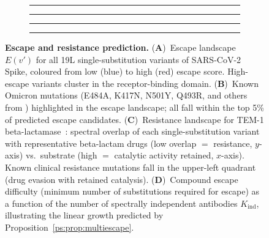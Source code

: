 \begin{figure}[t]
\centering
\begin{subfigure}[b]{0.23\textwidth}
  \rule{\textwidth}{0.6\textwidth}
  \caption{}
  \label{ps:fig:esc_landscape}
\end{subfigure}
\hfill
\begin{subfigure}[b]{0.23\textwidth}
  \rule{\textwidth}{0.6\textwidth}
  \caption{}
  \label{ps:fig:esc_omicron}
\end{subfigure}
\hfill
\begin{subfigure}[b]{0.23\textwidth}
  \rule{\textwidth}{0.6\textwidth}
  \caption{}
  \label{ps:fig:esc_resist}
\end{subfigure}
\hfill
\begin{subfigure}[b]{0.23\textwidth}
  \rule{\textwidth}{0.6\textwidth}
  \caption{}
  \label{ps:fig:esc_compound}
\end{subfigure}
\caption{\textbf{Escape and resistance prediction.}
(\textbf{A})~Escape landscape $E(v')$ for all 19L single-substitution variants
of SARS-CoV-2 Spike, coloured from low (blue) to high (red) escape score.
High-escape variants cluster in the receptor-binding domain.
(\textbf{B})~Known Omicron mutations (E484A, K417N, N501Y, Q493R, and others
from \citet{cameroni2022}) highlighted in the escape landscape; all fall within
the top 5\% of predicted escape candidates.
(\textbf{C})~Resistance landscape for TEM-1 beta-lactamase~\citep{bush2010}:
spectral overlap of each single-substitution variant with representative
beta-lactam drugs (low overlap $=$ resistance, $y$-axis) vs.\ substrate (high
$=$ catalytic activity retained, $x$-axis). Known clinical resistance mutations
fall in the upper-left quadrant (drug evasion with retained catalysis).
(\textbf{D})~Compound escape difficulty (minimum number of substitutions
required for escape) as a function of the number of spectrally independent
antibodies $K_{\text{ind}}$, illustrating the linear growth predicted by
Proposition~\ref{ps:prop:multiescape}.}
\label{ps:fig:escape}
\end{figure}

